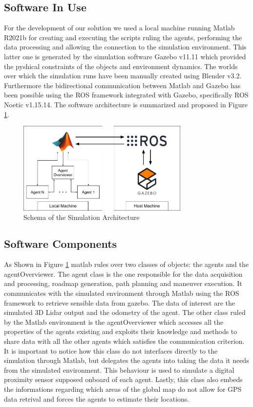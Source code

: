 \documentclass[twocolumn, a4paper]{article}
\begin{document}
\subsection{Software In Use}
For the development of our solution we used a local machine running Matlab
R2021b for creating and executing
the scripts ruling the agents, performing the data processing and allowing the 
connection to the simulation environment. This latter one is 
generated by the simulation software Gazebo v11.11 which provided the
pyshical constraints of the objects and environment dynamics. The worlds over
which the simulation runs have been manually created using Blender v3.2.
Furthermore the bidirectional communication between Matlab and Gazebo has
been possible using the ROS framework integrated with Gazebo, specifically
ROS Noetic v1.15.14.
The software architecture is summarized and proposed in Figure \ref{fig:S_Arch}.
\vspace{0.5cm}
\begin{figure}[h]
    \centering
    \includegraphics[width=8.5cm]{"../Report_images/Simulation_Architecture.png"}
    \caption{Schema of the Simulation Architecture}
    \label{fig:S_Arch}
\end{figure}
\subsection{Software Components}
As Shown in Figure \ref{fig:S_Arch} matlab rules over two classes of objects:
the agents and the agentOverviewer. The agent class is the one responsible 
for the data acquisition and processing, roadmap generation, path planning and
maneuver execution. It communicates with the simulated environment through
Matlab using the ROS
framework to retrieve sensible data from gazebo. The data of interest
are the simulated 3D Lidar output and the odometry of the agent.
The other class ruled by the Matlab environment is the agentOverviewer which
accesses all the properties of the agents existing and exploits their
knowledge and methods to share data with all the other agents which 
satisfies the communication criterion. It is important to notice how this
class do not interfaces directly to the simulation through Matlab, but
delegates the agents into taking the data it needs from the simulated
environment. This behaviour is used to simulate a digital proximity sensor
supposed onboard of each agent. Lastly, this class also embeds the informations
regarding which areas of the global map do not allow for GPS data retrival
and forces the agents to estimate their locations.
\end{document}
